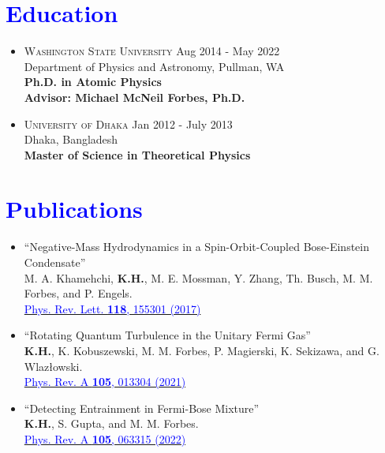 \documentclass[10pt,fleqn]{scrartcl}
\newcommand{\school}[3]{
   \item \textsc{#1} \hfill {#2}\\
   #3\\
}
\begin{document}
\noindent
\section*{\textcolor{blue}{Education}}
\begin{itemize}
\school{Washington State University}{Aug 2014 - May 2022}
            {Department of Physics and Astronomy, Pullman, WA}
 		\textbf{Ph.D. in Atomic Physics}  \\
		\textbf{Advisor: Michael McNeil Forbes, Ph.D.}
\school{University of Dhaka}{Jan 2012 -  July 2013}
            {Dhaka, Bangladesh}
 		\textbf{Master of Science in Theoretical Physics}  
\end{itemize}


\noindent

\section*{\textcolor{blue}{Publications}}
\begin{itemize}
\item ``Negative-Mass Hydrodynamics in a Spin-Orbit-Coupled Bose-Einstein 
        Condensate''\\
	    M. A. Khamehchi, \textbf{K.H.}, M. E. Mossman, Y. Zhang, Th. Busch, 
        M. M. Forbes, and P. Engels.\\
	   \href{https://journals.aps.org/prl/abstract/10.1103
                /PhysRevLett.118.155301}
	   {\textcolor{blue}{Phys. Rev. Lett. \textbf{118}, 155301 (2017)}}
\item ``Rotating Quantum Turbulence in the Unitary Fermi Gas''\\
        \textbf{K.H.}, K. Kobuszewski,  M. M. Forbes, P. Magierski, K. Sekizawa,
		and G. Wlazłowski.\\
      \href{https://journals.aps.org/pra/abstract/10.1103/PhysRevA.105.013304}
        {\textcolor{blue}{Phys. Rev. A \textbf{105}, 013304 (2021)}}
\item ``Detecting Entrainment in Fermi-Bose Mixture''\\
	  \textbf{K.H.}, S. Gupta, and M. M. Forbes.\\
        \href{https://journals.aps.org/pra/abstract/10.1103/
        PhysRevA.105.063315}{\textcolor{blue}
        {Phys. Rev. A \textbf{105}, 063315 (2022)}}
	  
	  
\end{itemize}

\noindent
\end{document}
